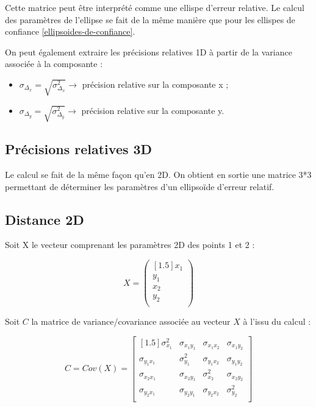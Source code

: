 \documentclass[french]{report}
\begin{document}
Cette matrice peut être interprété comme une ellispe d'erreur relative.
Le calcul des paramètres de l'ellipse se fait de la même manière que pour les ellispes de confiance \ref{ellipsoides-de-confiance}.

On peut également extraire les précisions relatives 1D à partir de la variance associée à la composante :
\begin{itemize}
\item $\sigma_{\Delta_{x}}=\sqrt{\sigma_{\Delta_{x}}^2} \rightarrow $ précision relative sur la composante x ;
\item $\sigma_{\Delta_{y}}=\sqrt{\sigma_{\Delta_{y}}^2} \rightarrow $ précision relative sur la composante y.
\end{itemize}


\subsection{Précisions relatives 3D}

Le calcul se fait de la même façon qu'en 2D. On obtient en sortie une matrice 3*3 permettant de déterminer les paramètres d'un ellipsoïde d'erreur relatif.

\subsection{Distance 2D}

Soit X le vecteur comprenant les paramètres 2D des points 1 et 2 :

$$X=\begin{pmatrix}[1.5] x_1 \\ y_1 \\ x_2 \\ y_2 \\ \end{pmatrix}$$

Soit $C$ la matrice de variance/covariance associée au vecteur $X$ à l'issu du calcul :

$$C=Cov(X)=\begin{bmatrix}[1.5]
\sigma_{x_{1}}^2 & \sigma_{x_{1}y_{1}} & \sigma_{x_{1}x_{2}} & \sigma_{x_{1}y_{2}} \\
\sigma_{y_{1}x_{1}} & \sigma_{y_{1}}^2 & \sigma_{y_{1}x_{2}} & \sigma_{y_{1}y_{2}} \\
\sigma_{x_{2}x_{1}} & \sigma_{x_{2}y_{1}} & \sigma_{x_{2}}^2 & \sigma_{x_{2}y_{2}}  \\
\sigma_{y_{2}x_{1}} & \sigma_{y_{2}y_{1}} & \sigma_{y_{2}x_{2}} & \sigma_{y_{2}}^2  \\ \end{bmatrix}$$
\end{document}
